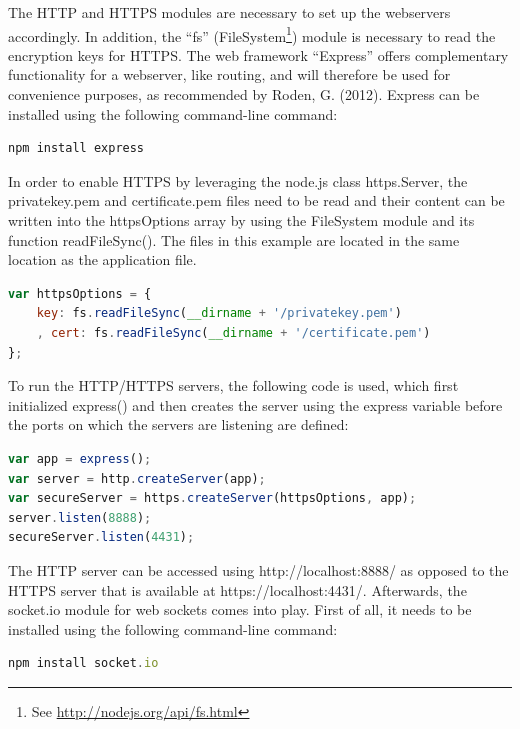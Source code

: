The HTTP and HTTPS modules are necessary to set up the webservers accordingly. 
In addition, the “fs” (FileSystem\footnote{See \url{ http://nodejs.org/api/fs.html}}) module is necessary to read the encryption keys for HTTPS. The web framework “Express” offers complementary functionality for a webserver, like routing, 
and will therefore be used for convenience purposes, as recommended by Roden, G. (2012). 
Express can be installed using the following command-line command:\\

\begin{lstlisting}[language=javascript,caption={Installing Express via command-line}]
npm install express 
\end{lstlisting}

In order to enable HTTPS by leveraging the node.js class https.Server, the privatekey.pem and certificate.pem files need to be read and their content can be written into the httpsOptions array by using the FileSystem module and its function readFileSync(). The files in this example are located in the same location as the application file.

\begin{lstlisting}[language=javascript,caption={Reading encryption keys}]
var httpsOptions = {
    key: fs.readFileSync(__dirname + '/privatekey.pem')
    , cert: fs.readFileSync(__dirname + '/certificate.pem')
};
\end{lstlisting}

To run the HTTP/HTTPS servers, the following code is used, which first initialized express() and then creates the server using the express variable before the ports on which the servers are listening are defined:

\begin{lstlisting}[language=javascript,caption={Starting servers}]
var app = express();
var server = http.createServer(app);
var secureServer = https.createServer(httpsOptions, app);
server.listen(8888);
secureServer.listen(4431);
\end{lstlisting}

The HTTP server can be accessed using http://localhost:8888/ as opposed to the HTTPS server that is available at https://localhost:4431/. Afterwards, the socket.io module for web sockets comes into play. First of all, it needs to be installed using the following command-line command:

\begin{lstlisting}[language=javascript,caption={Starting servers}]
npm install socket.io
\end{lstlisting}

